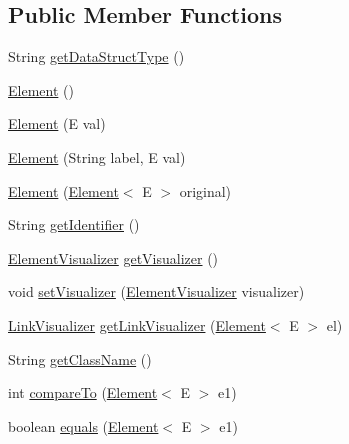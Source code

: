 \subsection*{Public Member Functions}
\begin{DoxyCompactItemize}
\item 
String \mbox{\hyperlink{classbridges_1_1base_1_1_element_a6a1b70fa4b1936d10c6deb433acf8cd9}{get\+Data\+Struct\+Type}} ()
\item 
\mbox{\hyperlink{classbridges_1_1base_1_1_element_aa5fc5728f2ed4b041118a77409442390}{Element}} ()
\item 
\mbox{\hyperlink{classbridges_1_1base_1_1_element_a6cb9b3b85b923602aad5c1be6696d825}{Element}} (E val)
\item 
\mbox{\hyperlink{classbridges_1_1base_1_1_element_a14e857e8050eac518900a458f0364d8e}{Element}} (String label, E val)
\item 
\mbox{\hyperlink{classbridges_1_1base_1_1_element_a91db9de70b65a1d7b5f27c1c0b909832}{Element}} (\mbox{\hyperlink{classbridges_1_1base_1_1_element}{Element}}$<$ E $>$ original)
\item 
String \mbox{\hyperlink{classbridges_1_1base_1_1_element_ad5496f568b4cca3909800eceea5fb47d}{get\+Identifier}} ()
\item 
\mbox{\hyperlink{classbridges_1_1base_1_1_element_visualizer}{Element\+Visualizer}} \mbox{\hyperlink{classbridges_1_1base_1_1_element_a42c84d41dfb7bd05a586e303cb33de72}{get\+Visualizer}} ()
\item 
void \mbox{\hyperlink{classbridges_1_1base_1_1_element_a5befa95788099f1bc72cdf5361c55bed}{set\+Visualizer}} (\mbox{\hyperlink{classbridges_1_1base_1_1_element_visualizer}{Element\+Visualizer}} visualizer)
\item 
\mbox{\hyperlink{classbridges_1_1base_1_1_link_visualizer}{Link\+Visualizer}} \mbox{\hyperlink{classbridges_1_1base_1_1_element_a7978552c7b36e28c302f611fc1958e7f}{get\+Link\+Visualizer}} (\mbox{\hyperlink{classbridges_1_1base_1_1_element}{Element}}$<$ E $>$ el)
\item 
String \mbox{\hyperlink{classbridges_1_1base_1_1_element_aa235244426486921bef319a28616bf8b}{get\+Class\+Name}} ()
\item 
int \mbox{\hyperlink{classbridges_1_1base_1_1_element_a6cd4c4f15c6a4f87f59e443cffe87a20}{compare\+To}} (\mbox{\hyperlink{classbridges_1_1base_1_1_element}{Element}}$<$ E $>$ e1)
\item 
boolean \mbox{\hyperlink{classbridges_1_1base_1_1_element_aff10d60700eb1aceca5c0b519bdccccb}{equals}} (\mbox{\hyperlink{classbridges_1_1base_1_1_element}{Element}}$<$ E $>$ e1)

\end{DoxyCompactItemize}
